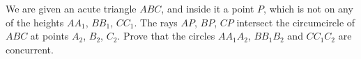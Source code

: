 We are given an acute triangle $ABC$, and inside it a point $P$, which is not on any of the heights $AA_1$, $BB_1$, $CC_1$. The rays $AP$, $BP$, $CP$ intersect the circumcircle of $ABC$ at points $A_2$, $B_2$, $C_2$. Prove that the circles $AA_1A_2$, $BB_1B_2$ and $CC_1C_2$ are concurrent.